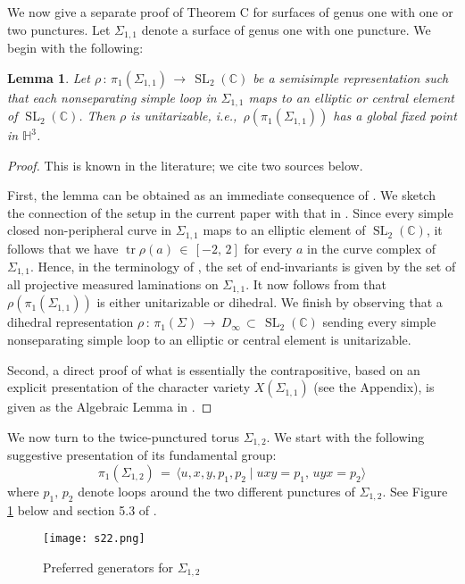 \documentclass[reqno]{amsart}
\theoremstyle{plain}
\newtheorem{lemma}[theorem]{Lemma}
\theoremstyle{definition}
\theoremstyle{remark}
\newcommand{\C}{{\mathbb{C}}}
\renewcommand{\H}{{\mathbb{H}}}
\DeclareMathOperator{\SL}{SL}
\DeclareMathOperator{\tr}{tr}
\begin{document}
We now give a separate proof of Theorem C for surfaces of genus one with one or two punctures. Let 
$\Sigma_{1,1}$ denote a surface of genus one with one puncture. We begin with the following:

\begin{lemma}\label{lem-s11}
Let $\rho \,: \,\pi_1(\Sigma_{1,1}) \,\to\, \SL_2(\C)$ be a semisimple representation such that each nonseparating
simple loop in $\Sigma_{1,1}$ maps to an elliptic or central element of $\SL_2(\C)$.
Then $\rho$ is unitarizable, i.e.,\ $\rho (\pi_1(\Sigma_{1,1}))$ has a global fixed point in $\H^3$.
\end{lemma}

\begin{proof}
This is known in the literature; we cite two sources below.

First, the lemma can be obtained as an immediate consequence of \cite[Theorem 1.2]{twz}. We sketch the 
connection of the setup in the current paper with that in \cite{twz}. Since every simple closed non-peripheral 
curve in $\Sigma_{1,1}$ maps to an elliptic element of $\SL_2(\C)$, it follows that we have 
$\tr\rho(a)\,\in\,[-2,\,2]$ for every $a$ in the curve complex of $\Sigma_{1,1}$. Hence, in the terminology of 
\cite{twz}, the set of end-invariants is given by the set of all projective measured laminations on 
$\Sigma_{1,1}$. It now follows from \cite[Theorem 1.2]{twz} that $\rho (\pi_1(\Sigma_{1,1}))$ is either 
unitarizable or dihedral. We finish by observing that a dihedral representation $\rho\,:\,\pi_1(\Sigma)\,\to\, 
D_\infty\,\subset\,\SL_2(\C)$ sending every simple nonseparating simple loop to an elliptic or central element is 
unitarizable.

Second, a direct proof of what is essentially the contrapositive, based on an explicit presentation of the 
character variety $X(\Sigma_{1,1})$ (see the Appendix), is given as the Algebraic Lemma in \cite[Section 
1.4.2]{dm}.
\end{proof}

We now turn to the twice-punctured torus $\Sigma_{1,2}$. We start with the following suggestive presentation of 
its fundamental group: $$\pi_1(\Sigma_{1,2}) \,=\,\langle u, x, y, p_1, p_2 \mid uxy = p_1, \, uyx = p_2 \rangle$$ 
where $p_1, \, p_2$ denote loops around the two different punctures of $\Sigma_{1,2}$. See Figure \ref{figs12} 
below and section 5.3 of \cite{goldman2}.

\begin{figure}[ht]
	\centering
	\texttt{[image: s22.png]}
	\caption{Preferred generators for $\Sigma_{1,2}$}
	\label{figs12}
\end{figure}
\end{document}
